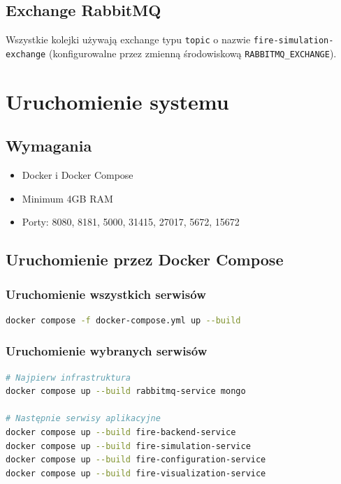 \subsection{Exchange RabbitMQ}

Wszystkie kolejki używają exchange typu \texttt{topic} o nazwie \texttt{fire-simulation-exchange} (konfigurowalne przez zmienną środowiskową \texttt{RABBITMQ\_EXCHANGE}).

\section{Uruchomienie systemu}

\subsection{Wymagania}

\begin{itemize}
    \item Docker i Docker Compose
    \item Minimum 4GB RAM
    \item Porty: 8080, 8181, 5000, 31415, 27017, 5672, 15672
\end{itemize}

\subsection{Uruchomienie przez Docker Compose}

\subsubsection{Uruchomienie wszystkich serwisów}

\begin{lstlisting}[language=bash, basicstyle=\small]
docker compose -f docker-compose.yml up --build
\end{lstlisting}

\subsubsection{Uruchomienie wybranych serwisów}

\begin{lstlisting}[language=bash, basicstyle=\small]
# Najpierw infrastruktura
docker compose up --build rabbitmq-service mongo

# Następnie serwisy aplikacyjne
docker compose up --build fire-backend-service
docker compose up --build fire-simulation-service
docker compose up --build fire-configuration-service
docker compose up --build fire-visualization-service
\end{lstlisting}

